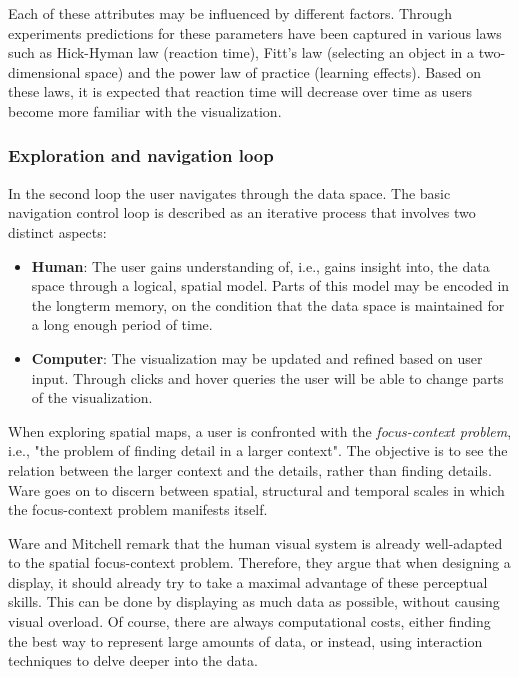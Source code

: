 Each of these attributes may be influenced by different factors. Through experiments predictions for these parameters have been captured in various laws such as Hick-Hyman law (reaction time), Fitt's law (selecting an object in a two-dimensional space) and the power law of practice (learning effects)\cite{ware:2004}. Based on these laws, it is expected that reaction time will decrease over time as users become more familiar with the visualization.


\subsubsection{Exploration and navigation loop}\label{subsubsection:exploration_navigation_loop}

In the second loop the user navigates through the data space. The basic navigation control loop is described as an iterative process that involves two distinct aspects\cite{ware:2004}:

\begin{itemize}
	\item \textbf{Human}: The user gains understanding of, i.e., gains insight into, the data space through a logical, spatial model. Parts of this model may be encoded in the longterm memory, on the condition that the data space is maintained for a long enough period of time.
	\item \textbf{Computer}: The visualization may be updated and refined based on user input. Through clicks and hover queries the user will be able to change parts of the visualization.
\end{itemize}

When exploring spatial maps, a user is confronted with the \emph{focus-context problem}, i.e., "the problem of finding detail in a larger context"\cite{ware:2004}. The objective is to see the relation between the larger context and the details, rather than finding details. Ware goes on to discern between spatial, structural and temporal scales in which the focus-context problem manifests itself\cite{ware:2004}.

Ware and Mitchell remark that the human visual system is already well-adapted to the spatial focus-context problem\cite{ware:2004}. Therefore, they argue that when designing a display, it should already try to take a maximal advantage of these perceptual skills. This can be done by displaying as much data as possible, without causing visual overload\cite{ware:2004}. Of course, there are always computational costs, either finding the best way to represent large amounts of data, or instead, using interaction techniques to delve deeper into the data\cite{herman:2000, shirley:2009}.

